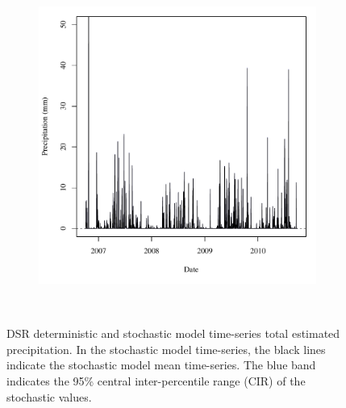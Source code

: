 \begin{linenumbers}
\begin{landscape}
\begin{figure}
\begin{subfigure}{0.7\textwidth}
			\includegraphics[width=\tableCustomSize]{"Figures/Results_DSR/Stochastic/A Precip"}
		\end{subfigure}\\
		\caption[DSR deterministic and stochastic model time-series total estimated precipitation.]{DSR deterministic and stochastic model time-series total estimated precipitation.  In the stochastic model time-series, the black lines indicate the stochastic model mean time-series.  The blue band indicates the 95\% central inter-percentile range (CIR) of the stochastic values.}
		\label{fig:reachPrecip_DS}
	\end{figure}
\end{landscape}

\subtabletop
\begin{table}[htbp]
	\centering
	\caption[USR deterministic and stochastic model time-series total estimated precipitation numeric results.]{USR deterministic and stochastic model time-series total estimated precipitation numeric results.  Total daily precipitation  rates are presented in units of \si{\milli\meter} (\si{\inch}).}
	\label{tab:reachPrecip_US}
	
\end{table}
\tablevspace
\begin{table}[htbp]
	\centering
	\caption[DSR deterministic and stochastic model time-series total estimated precipitation numeric results.]{DSR deterministic and stochastic model time-series total estimated precipitation numeric results.    Total daily precipitation  rates are presented in units of \si{\milli\meter} (\si{\inch}).}
	\label{tab:reachPrecip_DS}
	
\end{table}


\end{linenumbers}
